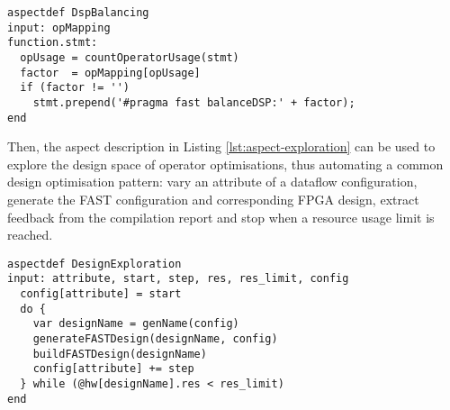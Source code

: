 \begin{lstlisting}[label=lst:aspect-DSP, style=lara,
  caption={Operator optimisation aspect description.}]
aspectdef DspBalancing
input: opMapping
function.stmt:
  opUsage = countOperatorUsage(stmt)
  factor  = opMapping[opUsage]
  if (factor != '')
    stmt.prepend('#pragma fast balanceDSP:' + factor);
end
\end{lstlisting}

Then, the aspect description in Listing \ref{lst:aspect-exploration}
can be used to explore the design space of operator optimisations,
thus automating a common design optimisation pattern: vary an
attribute of a dataflow configuration, generate the FAST configuration
and corresponding FPGA design, extract feedback from the compilation
report and stop when a resource usage limit is reached.

\begin{lstlisting}[label=lst:aspect-exploration, style=lara,
  caption={Iterative design space exploration aspect description.}]
aspectdef DesignExploration
input: attribute, start, step, res, res_limit, config
  config[attribute] = start
  do {
    var designName = genName(config)
    generateFASTDesign(designName, config)
    buildFASTDesign(designName)
    config[attribute] += step
  } while (@hw[designName].res < res_limit)
end
\end{lstlisting}


